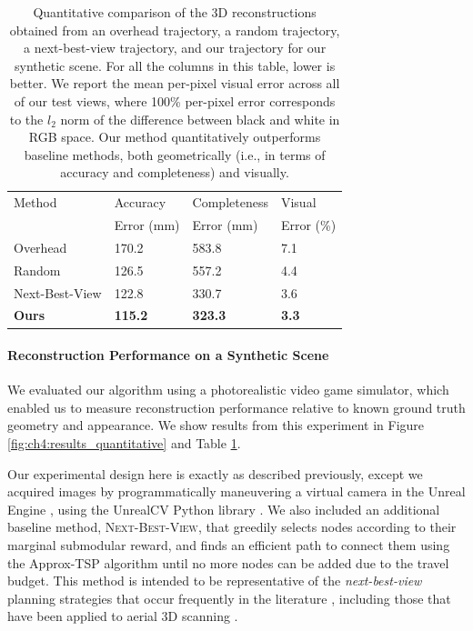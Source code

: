 \begin{table}[t]
\centering
\footnotesize
\begin{tabular}{@{}llll@{}}
\toprule
Method         & Accuracy       & Completeness   & Visual     \\
               & Error (mm)     & Error (mm)     & Error (\%) \\
\midrule
Overhead       & 170.2          & 583.8          & 7.1  \\
Random         & 126.5          & 557.2          & 4.4 \\
Next-Best-View & 122.8          & 330.7          & 3.6 \\
\textbf{Ours}  & \textbf{115.2} & \textbf{323.3} & \textbf{3.3} \\
\bottomrule
\end{tabular}
\normalsize
\caption{
Quantitative comparison of the 3D reconstructions obtained from an overhead trajectory, a random trajectory, a next-best-view trajectory, and our trajectory for our synthetic scene.
For all the columns in this table, lower is better.
We report the mean per-pixel visual error across all of our test views, where 100\% per-pixel error corresponds to the $l_2$ norm of the difference between black and white in RGB space.
Our method quantitatively outperforms baseline methods, both geometrically (i.e., in terms of accuracy and completeness) and visually.
}
\label{tbl:ch4:quantitative}
\end{table}

\paragraph{Reconstruction Performance on a Synthetic Scene}
We evaluated our algorithm using a photorealistic video game simulator, which
enabled us to measure reconstruction performance relative to known ground truth geometry and appearance.
We show results from this experiment in Figure \ref{fig:ch4:results_quantitative} and Table \ref{tbl:ch4:quantitative}.

Our experimental design here is exactly as described previously, except we acquired images by programmatically maneuvering a virtual camera in the Unreal Engine \cite{epic:2017a}, using the UnrealCV Python library \cite{qiu:2016}.
We also included an additional baseline method, \textsc{Next-Best-View}, that greedily selects nodes according to their marginal submodular reward, and finds an efficient path to connect them using the Approx-TSP algorithm \cite{cormen:2009} until no more nodes can be added due to the travel budget.
This method is intended to be representative of the \emph{next-best-view} planning strategies that occur frequently in the literature \cite{fan:2016,hollinger:2013,krainin:2011,wu:2014}, including those that have been applied to aerial 3D scanning \cite{dunn:2009a,hoppe:2012,mostegel:2016,schmid:2012}.

